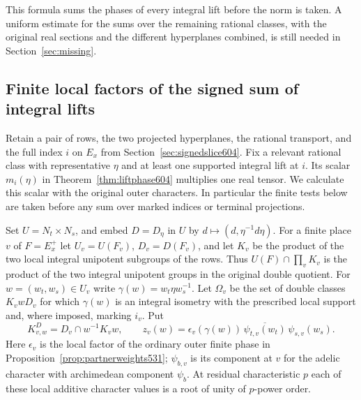 \documentclass[a4paper,11pt]{article}
\theoremstyle{definition}
\theoremstyle{remark}
\numberwithin{equation}{section}
\begin{document}
This formula sums the phases of every integral lift before
the norm is taken. A uniform estimate for the sums over
the remaining rational classes, with the original real
sections and the different hyperplanes combined, is still
needed in Section~\ref{sec:missing}.


\subsection{Finite local factors of the signed sum of integral lifts}
\label{sec:localphase605}

Retain a pair of rows, the two projected hyperplanes, the rational
transport, and the full index \(i\) on \(E_x\) from
Section~\ref{sec:signedslice604}. Fix a relevant rational class
with representative \(\eta\) and at least one supported integral
lift at \(i\). Its scalar \(m_i(\eta)\) in
Theorem~\ref{thm:liftphase604} multiplies one real tensor. We
calculate this scalar with the original outer characters. In
particular the finite tests below are taken before any sum
over marked indices or terminal projections.

Set \(U=N_t\times N_s\), and embed \(D=D_\eta\) in \(U\) by
\(d\mapsto(d,\eta^{-1}d\eta)\). For a finite place \(v\) of
\(F=E_x^+\) let \(U_v=U(F_v)\), \(D_v=D(F_v)\), and let
\(K_v\) be the product of the two local integral unipotent
subgroups of the rows. Thus \(U(F)\cap\prod_v K_v\) is the
product of the two integral unipotent groups in the original
double quotient. For \(w=(w_t,w_s)\in U_v\) write
\(\gamma(w)=w_t\eta w_s^{-1}\). Let \(\Omega_v\) be the set
of double classes \(K_v w D_v\) for which \(\gamma(w)\) is
an integral isometry with the prescribed local support and,
where imposed, marking \(i_v\). Put
\[
   K^D_{v,w}=D_v\cap w^{-1}K_v w,\qquad
   z_v(w)=\epsilon_v(\gamma(w))\,
         \overline{\psi_{t,v}(w_t)}\,\psi_{s,v}(w_s).
\]
Here \(\epsilon_v\) is the local factor of the ordinary outer
finite phase in Proposition~\ref{prop:partnerweights531};
\(\psi_{b,v}\) is its component at \(v\) for the adelic character
with archimedean component \(\psi_b\). At residual characteristic \(p\)
each of these local additive character values is a root of
unity of \(p\)-power order.
\end{document}
